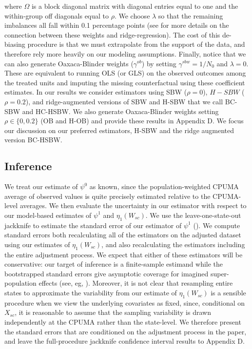 \documentclass[12pt]{article}
\begin{document}
where $\Omega$ is a block diagonal matrix with diagonal entries equal to one and the within-group off diagonals equal to $\rho$. We choose $\lambda$ so that the remaining imbalances all fall within 0.1 percentage points (see \cite{ben2018augmented} for more details on the connection between these weights and ridge-regression). The cost of this de-biasing procedure is that we must extrapolate from the support of the data, and therefore rely more heavily on our modeling assumptions. Finally, notice that we can also generate Oaxaca-Blinder weights ($\gamma^{ob}$) by setting $\gamma^{sbw} = 1/N_0$ and $\lambda = 0$. These are equivalent to running OLS (or GLS) on the observed outcomes among the treated units and imputing the missing counterfactual using these coefficient estimates. In our results we consider estimators using SBW ($\rho = 0$), $H-SBW$ ($\rho = 0.2$), and ridge-augmented versions of SBW and H-SBW that we call BC-SBW and HC-HSBW. We also generate Oaxaca-Blinder weights setting $\rho \in \{0, 0.2\}$ (OB and H-OB) and provide these results in Appendix D. We focus our discussion on our preferred estimators, H-SBW and the ridge augmented version BC-HSBW. 
\subsection{Inference}

We treat our estimate of $\psi^0$ as known, since the population-weighted CPUMA average of observed values is quite precisely estimated relative to the CPUMA-level averages. We then evaluate the uncertainty in our estimator with respect to our model-based estimates of $\psi^1$ and $\eta_1(W_{sc})$. We use the leave-one-state-out jackknife to estimate the standard error of our estimator of $\psi^1$ (\cite{cameron2015practitioner}). We compute standard errors both recalculating all of the estimators on the adjusted dataset using our estimates of $\eta_1(W_{sc})$, and also recalculating the estimators including the entire adjustment process. We expect that either of these estimators will be conservative: our target of inference is a finite-sample estimand while the bootstrapped standard errors give asymptotic coverage for imagined super-population effects (see, eg, \cite{imbens2015causal}). Moreover, it is not clear that resampling entire states to approximate the variability from our estimate of $\eta_1(W_{sc})$ is a sensible procedure when we view the underlying covariates as fixed, since, conditional on $X_{sc}$, it is reasonable to assume that the sampling variability is drawn independently at the CPUMA rather than the state-level. We therefore present the standard errors that are conditioned on the adjustment process in the paper, and leave the full-procedure jackknife confidence interval results to Appendix D. 
\end{document}
